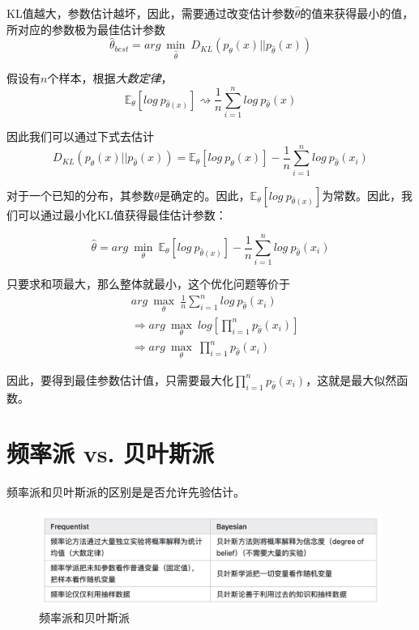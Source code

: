 KL值越大，参数估计越坏，因此，需要通过改变估计参数$\hat{\theta}$的值来获得最小的值，所对应的参数极为最佳估计参数
\begin{equation}
    \hat{\theta}_{best}=arg\ \min\limits_{\hat{\theta}}\ D_{KL}(p_\theta(x)||p_{\hat{\theta}}(x))
\end{equation}

假设有$n$个样本，根据\textsl{大数定律}，
\begin{equation}
    \mathbb{E}_{\theta}[log\ p_{\hat{\theta}(x)}]\rightsquigarrow \frac{1}{n}\sum\limits_{i=1}^{n}log\ p_{\hat{\theta}}(x)
\end{equation}

因此我们可以通过下式去估计
\begin{equation}
    D_{KL}(p_{\theta}(x)||p_{\hat{\theta}}(x))=\mathbb{E}_{\theta}[log\ p_{\theta}(x)]-\frac{1}{n}\sum\limits_{i=1}^{n}log\ p_{\hat{\theta}}(x_i)
\end{equation}

对于一个已知的分布，其参数$\theta$是确定的。因此，$\mathbb{E}_{\theta}[log\ p_{\hat{\theta}(x)}]$为常数。因此，我们可以通过最小化KL值获得最佳估计参数：

\begin{equation}
    \hat{\theta}=arg\ \min\limits_{\theta}\ \mathbb{E}_{\theta}[log\ p_{\hat{\theta}(x)}]-\frac{1}{n}\sum\limits_{i=1}^{n}log\ p_{\hat{\theta}}(x_i)
\end{equation}

只要求和项最大，那么整体就最小，这个优化问题等价于
\begin{equation}
    \begin{aligned}
        & arg\ \max\limits_{\theta}\ \frac{1}{n}\sum\limits_{i=1}^{n}log\ p_{\hat{\theta}}(x_i)\\
        & \Rightarrow arg\ \max\limits_{\theta}\ log[\prod\limits_{i=1}^{n}p_{\hat{\theta}}(x_i)]\\
        & \Rightarrow arg\ \max\limits_{\theta}\ \prod\limits_{i=1}^{n}p_{\hat{\theta}}(x_i)
    \end{aligned}
\end{equation}

因此，要得到最佳参数估计值，只需要最大化$\prod\limits_{i=1}^{n}p_{\hat{\theta}}(x_i)$，这就是最大似然函数。

\section{频率派 vs. 贝叶斯派}

频率派和贝叶斯派的区别是是否允许先验估计。
\begin{figure}[H]
    \centering
    \includegraphics[scale=0.3]{figures/频率派和贝叶斯派.png}
    \caption{频率派和贝叶斯派}
\end{figure}



